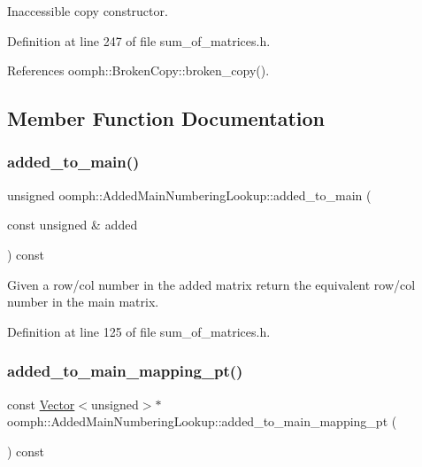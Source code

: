 Inaccessible copy constructor. 



Definition at line 247 of file sum\+\_\+of\+\_\+matrices.\+h.



References oomph\+::\+Broken\+Copy\+::broken\+\_\+copy().



\subsection{Member Function Documentation}
\mbox{\label{classoomph_1_1AddedMainNumberingLookup_a65297d7f82675ef555e59a98875ead4d}} 
\subsubsection{\texorpdfstring{added\+\_\+to\+\_\+main()}{added\_to\_main()}}
{\footnotesize\ttfamily unsigned oomph\+::\+Added\+Main\+Numbering\+Lookup\+::added\+\_\+to\+\_\+main (\begin{DoxyParamCaption}\item[{const unsigned \&}]{added }\end{DoxyParamCaption}) const\hspace{0.3cm}{\ttfamily [inline]}}

Given a row/col number in the added matrix return the equivalent row/col number in the main matrix. 

Definition at line 125 of file sum\+\_\+of\+\_\+matrices.\+h.

\mbox{\label{classoomph_1_1AddedMainNumberingLookup_a28e014d37c7dffa2365cb187464e02d7}} 
\subsubsection{\texorpdfstring{added\+\_\+to\+\_\+main\+\_\+mapping\+\_\+pt()}{added\_to\_main\_mapping\_pt()}}
{\footnotesize\ttfamily const \hyperlink{classoomph_1_1Vector}{Vector}$<$unsigned$>$$\ast$ oomph\+::\+Added\+Main\+Numbering\+Lookup\+::added\+\_\+to\+\_\+main\+\_\+mapping\+\_\+pt (\begin{DoxyParamCaption}{ }\end{DoxyParamCaption}) const\hspace{0.3cm}{\ttfamily [inline]}}



